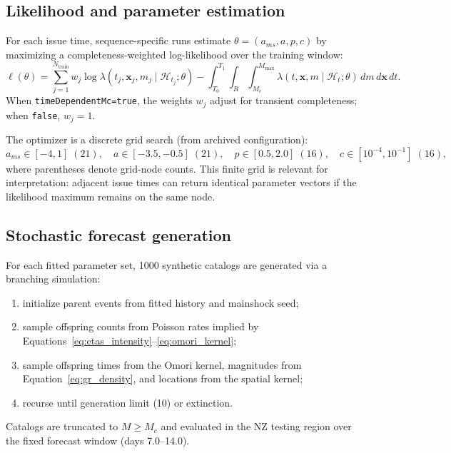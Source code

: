 \documentclass[12pt,letterpaper]{article}
\newcommand{\Mc}{M_c}
\begin{document}
\subsection{Likelihood and parameter estimation}

For each issue time, sequence-specific runs estimate
$\theta=(a_{ms},a,p,c)$ by maximizing a completeness-weighted log-likelihood
over the training window:
\begin{equation}
\ell(\theta)=
\sum_{j=1}^{N_{\mathrm{train}}}
w_j \log \lambda(t_j,\mathbf{x}_j,m_j \mid \mathcal{H}_{t_j};\theta)
-\int_{T_0}^{T_1}\!\!\int_R\!\!\int_{\Mc}^{M_{\max}}
\lambda(t,\mathbf{x},m \mid \mathcal{H}_t;\theta)\,dm\,d\mathbf{x}\,dt.
\label{eq:weighted_ll}
\end{equation}
When \texttt{timeDependentMc=true}, the weights $w_j$ adjust for transient
completeness; when \texttt{false}, $w_j=1$.

The optimizer is a discrete grid search (from archived configuration):
\begin{equation}
a_{ms}\in[-4,1]\;(21),\quad
a\in[-3.5,-0.5]\;(21),\quad
p\in[0.5,2.0]\;(16),\quad
c\in[10^{-4},10^{-1}]\;(16),
\label{eq:grid_ranges}
\end{equation}
where parentheses denote grid-node counts. This finite grid is relevant for
interpretation: adjacent issue times can return identical parameter vectors if
the likelihood maximum remains on the same node.

\subsection{Stochastic forecast generation}

For each fitted parameter set, 1000 synthetic catalogs are generated via a
branching simulation:
\begin{enumerate}
    \item initialize parent events from fitted history and mainshock seed;
    \item sample offspring counts from Poisson rates implied by
          Equations~\ref{eq:etas_intensity}--\ref{eq:omori_kernel};
    \item sample offspring times from the Omori kernel, magnitudes from
          Equation~\ref{eq:gr_density}, and locations from the spatial kernel;
    \item recurse until generation limit (10) or extinction.
\end{enumerate}
Catalogs are truncated to $M\ge\Mc$ and evaluated in the NZ testing region over
the fixed forecast window (days 7.0--14.0).
\end{document}
